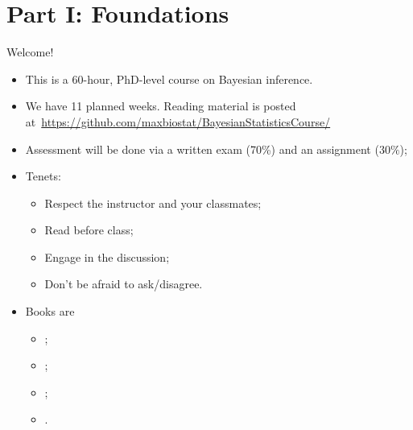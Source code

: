 \begin{frame}
\titlepage %
\end{frame}
\section{Part I: Foundations}
\begin{frame}{Welcome!}
\begin{itemize}
 \item This is a 60-hour, PhD-level course on Bayesian inference.
 \item We have 11 planned weeks. Reading material is posted at~\url{https://github.com/maxbiostat/BayesianStatisticsCourse/}
 \item Assessment will be done via a written exam (70\%) and an assignment ($30\%$);
 \item Tenets:
 \begin{itemize}
  \item Respect the instructor and your classmates;
  \item Read before class;
  \item Engage in the discussion;
  \item Don't be afraid to ask/disagree.
 \end{itemize}
 \item Books are
 \begin{itemize}
  \item  \cite{Robert2007};
  \item \cite{Hoff2009};
  \item  \cite{Schervish1995};
  \item \cite{Bernardo2000}.  
 \end{itemize}
\end{itemize}
\end{frame}

